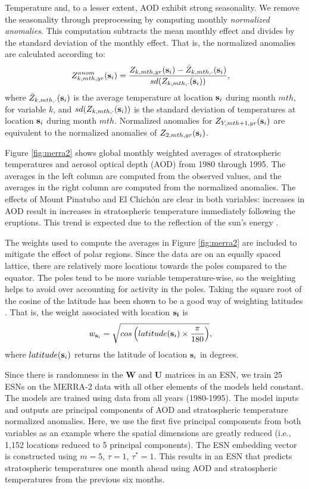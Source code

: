 \documentclass[AMS,STIX2COL]{WileyNJD-v2}
\begin{document}
Temperature and, to a lesser extent, AOD exhibit strong seasonality. We remove the seasonality through preprocessing by computing monthly \emph{normalized anomalies}. This computation subtracts the mean monthly effect and divides by the standard deviation of the monthly effect. That is, the normalized anomalies are calculated according to:
\begin{align}
    Z^{anom}_{k,mth,yr}({\bf s}_i) &= \frac{Z_{k,mth,yr}({\bf s}_i)-\bar{Z}_{k,mth,\cdot}({\bf s}_i)}{sd(Z_{k,mth,\cdot}({\bf s}_i))}, \label{eq:anomaly}
\end{align}
\noindent where $\bar{Z}_{k,mth,\cdot}({\bf s}_i)$ is the average temperature at location ${\bf s}_i$ during month $mth$, for variable $k$, and $sd(Z_{k,mth,\cdot}({\bf s}_i))$ is the standard deviation of temperatures at location ${\bf s}_i$ during month $mth$. Normalized anomalies for $Z_{Y,mth+1,yr}({\bf s}_i)$ are equivalent to the normalized anomalies of $Z_{2,mth,yr}({\bf s}_i)$. 

Figure \ref{fig:merra2} shows global monthly weighted averages of stratospheric temperatures and aerosol optical depth (AOD) from 1980 through 1995. The averages in the left column are computed from the observed values, and the averages in the right column are computed from the normalized anomalies. The effects of Mount Pinatubo and El Chichón are clear in both variables: increases in AOD result in increases in stratospheric temperature immediately following the eruptions. This trend is expected due to the reflection of the sun's energy \citep{labitzke1992}.

The weights used to compute the averages in Figure \ref{fig:merra2} are included to mitigate the effect of polar regions. Since the data are on an equally spaced lattice, there are relatively more locations towards the poles compared to the equator. The poles tend to be more variable temperature-wise, so the weighting helps to avoid over accounting for activity in the poles. Taking the square root of the cosine of the latitude has been shown to be a good way of weighting latitudes \citep{huth2006}. That is, the weight associated with location $\bf{s}_i$ is 
\begin{align}
    w_{{\bf s}_i} &= \sqrt{cos \left( latitude({\bf s}_i) \times \frac{\pi}{180} \right)}, \label{eq:weights}
\end{align}
where $latitude({\bf s}_i)$ returns the latitude of location ${\bf s}_i$ in degrees.

Since there is randomness in the \textbf{W} and \textbf{U} matrices in an ESN, we train 25 ESNs on the MERRA-2 data with all other elements of the models held constant. The models are trained using data from all years (1980-1995). The model inputs and outputs are principal components of AOD and stratospheric temperature normalized anomalies. Here, we use the first five principal components from both variables as an example where the spatial dimensions are greatly reduced (i.e., 1,152 locations reduced to 5 principal components). The ESN embedding vector is constructed using $m=5$, $\tau=1$, $\tau^*=1$. This results in an ESN that predicts stratospheric temperatures one month ahead using AOD and stratospheric temperatures from the previous six months.
\end{document}
